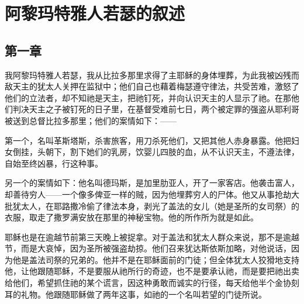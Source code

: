 
\chapter{阿黎玛特雅人若瑟的叙述}


\par


\section{第一章}

我阿黎玛特雅人若瑟，我从比拉多那里求得了主耶稣的身体埋葬，为此我被凶残而敌天主的犹太人关押在监狱中；他们自己也藉着梅瑟遵守律法，共受苦难，激怒了他们的立法者，却不知祂是天主，把祂钉死，并向认识天主的人显示了祂。在那他们判决天主之子被钉死的日子里，在基督受难前七日，两个被定罪的强盗从耶利哥被送到总督比拉多那里；他们的案情如下：——\par

第一个，名叫革斯塔斯，杀害旅客，用刀杀死他们，又把其他人赤身暴露。他把妇女倒挂，头朝下，割下她们的乳房，饮婴儿四肢的血，从不认识天主，不遵法律，自始至终凶暴，行这种事。\par

另一个的案情如下：他名叫德玛斯，是加里肋亚人，开了一家客店。他袭击富人，却善待穷人——一个像多俾亚一样的贼，因为他埋葬穷人的尸体。他又从事抢劫大批犹太人，在耶路撒冷偷了律法本身，剥光了盖法的女儿（她是圣所的女司祭）的衣服，取走了撒罗满安放在那里的神秘宝物。他的所作所为就是如此。\par

耶稣也是在逾越节前第三天晚上被捉拿。对于盖法和犹太人群众来说，那不是逾越节，而是大哀悼，因为圣所被强盗劫掠。他们召来犹达斯依斯加略，对他说话，因为他是盖法司祭的兄弟的。他并不是在耶稣面前的门徒；但全体犹太人狡猾地支持他，让他跟随耶稣，不是要服从祂所行的奇迹，也不是要承认祂，而是要把祂出卖给他们，希望抓住祂的某个谎言，因这种勇敢而诚实的行径，每天给他半个金协刻耳的礼物。他跟随耶稣做了两年这事，如祂的一个名叫若望的门徒所说。\par

